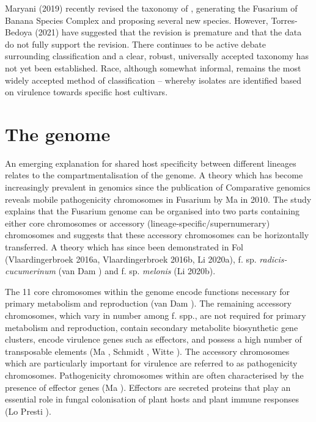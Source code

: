 Maryani \et (2019) recently revised the taxonomy of \Foc, generating the Fusarium of Banana Species Complex and proposing several new species. However, Torres-Bedoya \et (2021) have suggested that the revision is premature and that the data do not fully support the revision. There continues to be active debate surrounding \Foc classification and a clear, robust, universally accepted taxonomy has not yet been established. Race, although somewhat informal, remains the most widely accepted method of \Foc classification – whereby isolates are identified based on virulence towards specific host cultivars.  



\section{The \Fo genome} 

An emerging explanation for shared host specificity between different \Foxy lineages relates to the compartmentalisation of the \Fo genome. A theory which has become increasingly prevalent in \Fo genomics since the publication of Comparative genomics reveals mobile pathogenicity chromosomes in Fusarium by Ma \et in 2010. The study explains that the Fusarium genome can be organised into two parts containing either core chromosomes or accessory (lineage-specific/supernumerary) chromosomes and suggests that these accessory chromosomes can be horizontally transferred. A theory which has since been demonstrated in Fol (Vlaardingerbroek \et 2016a, Vlaardingerbroek \et 2016b, Li \et 2020a), \Fo f. sp. \textit{radicis-cucumerinum} (van Dam ) and \Fo f. sp. \textit{melonis} (Li \et 2020b). 

The 11 core chromosomes within the \Fo genome encode functions necessary for primary metabolism and reproduction (van Dam ).  The remaining accessory chromosomes, which vary in number among f. spp., are not required for primary metabolism and reproduction, contain secondary metabolite biosynthetic gene clusters, encode virulence genes such as effectors, and possess a high number of transposable elements (Ma , Schmidt , Witte ). The accessory chromosomes which are particularly important for virulence are referred to as pathogenicity chromosomes.  Pathogenicity chromosomes within \Fo are often characterised by the presence of effector genes (Ma ). Effectors are secreted proteins that play an essential role in fungal colonisation of plant hosts and plant immune responses (Lo Presti ).  

